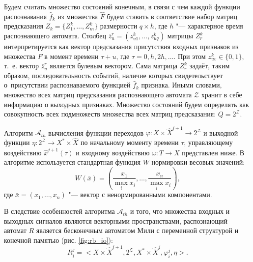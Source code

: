 \documentclass[a4paper, 12pt]{article}
\theoremstyle{plain}
\begin{document}
	Будем считать множество состояний конечным, в связи с чем каждой функции распознавания $\hat f_k$ из множества $\hat F$ будем ставить в соответствие набор матриц предсказания $Z_k=\{Z_1^k,…,Z_m^k\}$ размерности $q\times h$, где $h$ "--- характерное время распознающего автомата. Столбец $\bar{z}_u^r=(z_{u1}^k,…,z_{uq}^k)$ матрицы $Z_r^k$ интерпретируется как вектор предсказания присутствия входных признаков из множества $F$ в момент времени $\tau+u$, где $\tau = 0,h,2h,\dots$. При этом $z_{uv}^k\in\{0,1\}$, т.~е. вектор $\bar{z}_u^r$ является булевым вектором. Сама матрица $Z_r^k$ задаёт, таким образом, последовательность событий, наличие которых свидетельствует о~присутствии распознаваемого функцией $\hat f_k$ признака. Иными словами, множество всех матриц предсказания распознающего автомата $\mathcal Z$ хранит в себе информацию о выходных признаках. Множество состояний будем определять как совокупность всех подмножеств множества всех матриц предсказания: $Q=2^{\mathcal Z}$.
	
	Алгоритм $\mathcal A_{th}$ вычисления функции переходов $\varphi:X\times\hat X^{j+1}\to 2^{\mathcal Z}$ и выходной функции $\eta:2^{\mathcal Z}\to X^*\times\hat X$ по начальному моменту времени $\tau$, управляющему воздействию $\hat x^{j+1}(\tau)$ и входному воздействию $\omega:T\to X$ представлен ниже. В алгоритме используется стандартная функция $W$ нормировки весовых значений:
	\begin{equation}
	W(\bar x)=\left(\frac{x_1}{\max\limits_i x_i},\dots,\frac{x_n}{\max\limits_i x_i}\right),
	\end{equation} 
	где $\bar x=(x_1,\dots,x_n)$ "--- вектор с ненормированными компонентами.
	
	В следствие особенностей алгоритма $\mathcal A_{th}$ и  того, что множества входных и выходных сигналов являются векторными пространствами, распознающий автомат $R$ является бесконечным автоматом Мили с переменной структурой и конечной памятью (рис. \ref{fig:rb_io}): 
	\begin{equation}
	R_i^j=<X\times\hat X^{j+1}, 2^{\mathcal Z}, X^*\times\hat X^j,\varphi_i^j,\eta>.
	\end{equation}
\end{document}
